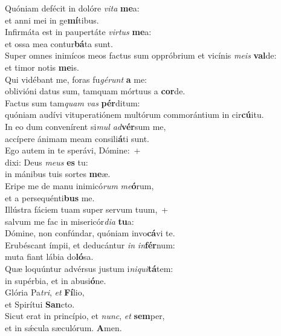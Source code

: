 \evenverse Quóniam defécit in dolóre \textit{vi}\textit{ta} \textbf{me}a:~\*\\
\evenverse et anni mei in ge\textbf{mí}tibus.\\
\oddverse Infirmáta est in paupertáte \textit{vir}\textit{tus} \textbf{me}a:~\*\\
\oddverse et ossa mea contur\textbf{bá}ta sunt.\\
\evenverse Super omnes inimícos meos factus sum oppróbrium et vicínis \textit{me}\textit{is} \textbf{val}de:~\*\\
\evenverse et timor notis \textbf{me}is.\\
\oddverse Qui vidébant me, foras fu\textit{gé}\textit{runt} \textbf{a} me:~\*\\
\oddverse oblivióni datus sum, tamquam mórtuus a \textbf{cor}de.\\
\evenverse Factus sum tam\textit{quam} \textit{vas} \textbf{pér}ditum:~\*\\
\evenverse quóniam audívi vituperatiónem multórum commorántium in cir\textbf{cú}itu.\\
\oddverse In eo dum convenírent si\textit{mul} \textit{ad}\textbf{vér}sum me,~\*\\
\oddverse accípere ánimam meam consili\textbf{á}ti sunt.\\
\evenverse Ego autem in te sperávi, Dómine:~+\\
\evenverse  dixi: Deus \textit{me}\textit{us} \textbf{es} tu:~\*\\
\evenverse in mánibus tuis sortes \textbf{me}æ.\\
\oddverse Eripe me de manu inimicó\textit{rum} \textit{me}\textbf{ó}rum,~\*\\
\oddverse et a persequénti\textbf{bus} me.\\
\evenverse Illústra fáciem tuam super servum tuum,~+\\
\evenverse  salvum me fac in misericór\textit{di}\textit{a} \textbf{tu}a:~\*\\
\evenverse Dómine, non confúndar, quóniam invo\textbf{cá}vi te.\\
\oddverse Erubéscant ímpii, et deducántur \textit{in} \textit{in}\textbf{fér}num:~\*\\
\oddverse muta fiant lábia do\textbf{ló}sa.\\
\evenverse Quæ loquúntur advérsus justum i\textit{ni}\textit{qui}\textbf{tá}tem:~\*\\
\evenverse in supérbia, et in abusi\textbf{ó}ne.\\
\oddverse Glória Pa\textit{tri}, \textit{et} \textbf{Fí}lio,~\*\\
\oddverse et Spirítui \textbf{San}cto.\\
\evenverse Sicut erat in princípio, et \textit{nunc}, \textit{et} \textbf{sem}per,~\*\\
\evenverse et in sǽcula sæculórum. \textbf{A}men.\\
